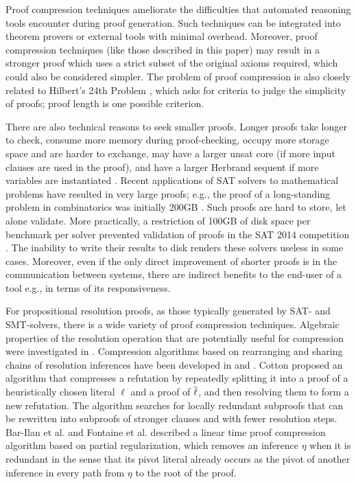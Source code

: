 Proof compression techniques ameliorate the difficulties that automated reasoning tools encounter during proof generation. Such techniques can be integrated into theorem provers or external tools with minimal overhead. Moreover, proof compression techniques (like those described in this paper) may result in a stronger proof which uses a strict subset of the original axioms required, which could also be considered simpler. The problem of proof compression is also closely related to Hilbert's 24th Problem \cite{Hilbert24Problem}, which asks for criteria to judge the simplicity of proofs; proof length is one possible criterion. 


There are also technical reasons to seek smaller proofs.
Longer proofs take longer to check, consume more memory during proof-checking, occupy more storage space and are harder to exchange, may have a larger unsat core (if more input clauses are used in the proof), and have a larger Herbrand sequent if more variables are instantiated \cite{B10,B16,ResolutionHerbrand,Reis}. Recent applications of SAT solvers to mathematical problems have resulted in very large proofs; e.g., the proof of a long-standing problem in combinatorics was initially 200GB \cite{heule2016solving}. Such proofs are hard to store, let alone validate. More practically, a restriction of 100GB of disk space per benchmark per solver prevented validation of proofs in the SAT 2014 competition \cite{clausal}. 
The inability to write their results to disk renders these solvers useless in some cases. Moreover, even if the only direct improvement of shorter proofs is in the communication between systems, there are indirect benefits to the end-user of a tool e.g., in terms of its responsiveness. 


For propositional resolution proofs, as those typically generated by SAT- and SMT-solvers, there is a wide variety of proof compression techniques. Algebraic properties of the resolution operation that are potentially useful for compression were investigated in \cite{bwp10}.
Compression algorithms based on rearranging and sharing chains of resolution inferences have been
developed in \cite{Amjad07} and \cite{Sinz}.  Cotton \cite{CottonSplit} proposed an algorithm that
compresses a refutation by repeatedly splitting it into a proof of a heuristically chosen literal $\ell$
and a proof of $\overline{\ell}$, and then resolving them to form a new refutation.  The {\ReduceReconstruct} algorithm \cite{RedRec} searches for locally redundant
subproofs that can be rewritten into subproofs of stronger clauses and with fewer resolution steps.
Bar-Ilan et al. \cite{RP08} and Fontaine et al. \cite{LURPI} described a linear time proof compression algorithm based on partial
regularization, which removes an inference $\eta$ when it is redundant in the sense that its pivot literal already occurs as the pivot of another inference in every path from $\eta$ to the root of the proof.

